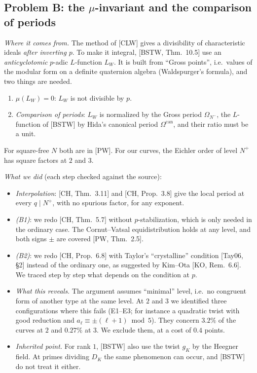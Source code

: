 \documentclass[11pt]{amsart}
\begin{document}
\subsection*{Problem B: the $\mu$-invariant and the comparison of periods}
\emph{Where it comes from.} The method of [CLW] gives a divisibility of characteristic ideals \emph{after inverting $p$}. To make it integral, [BSTW, Thm.~10.5] use an \emph{anticyclotomic} $p$-adic $L$-function $L_W$. It is built from ``Gross points'', i.e.\ values of the modular form on a definite quaternion algebra (Waldspurger's formula), and two things are needed.
\begin{enumerate}[label=(B\arabic*)]
\item \emph{$\mu(L_W)=0$}: $L_W$ is not divisible by $p$.
\item \emph{Comparison of periods}: $L_W$ is normalized by the Gross period $\Omega_{N^-}$, the $L$-function of [BSTW] by Hida's canonical period $\Omega^{\mathrm{can}}$, and their ratio must be a unit.
\end{enumerate}
For square-free $N$ both are in [PW]. For our curves, the Eichler order of level $N^+$ has square factors at $2$ and $3$.

\emph{What we did} (each step checked against the source):
\begin{itemize}
\item \emph{Interpolation}: [CH, Thm.~3.11] and [CH, Prop.~3.8] give the local period at every $q\mid N^+$, with no spurious factor, for any exponent.
\item \emph{(B1)}: we redo [CH, Thm.~5.7] without $p$-stabilization, which is only needed in the ordinary case. The Cornut--Vatsal equidistribution holds at any level, and both signs $\pm$ are covered [PW, Thm.~2.5].
\item \emph{(B2)}: we redo [CH, Prop.~6.8] with Taylor's ``crystalline'' condition [Tay06, \S2] instead of the ordinary one, as suggested by Kim--Ota [KO, Rem.~6.6]. We traced step by step what depends on the condition at $p$.
\item \emph{What this reveals.} The argument assumes ``minimal'' level, i.e.\ no congruent form of another type at the same level. At $2$ and $3$ we identified three configurations where this fails (E1--E3; for instance a quadratic twist with good reduction and $a_\ell\equiv\pm(\ell+1)\bmod5$). They concern $3.2\%$ of the curves at $2$ and $0.27\%$ at $3$. We exclude them, at a cost of $0.4$ points.
\item \emph{Inherited point.} For rank $1$, [BSTW] also use the twist $g_K$ by the Heegner field. At primes dividing $D_K$ the same phenomenon can occur, and [BSTW] do not treat it either.
\end{itemize}
\end{document}
